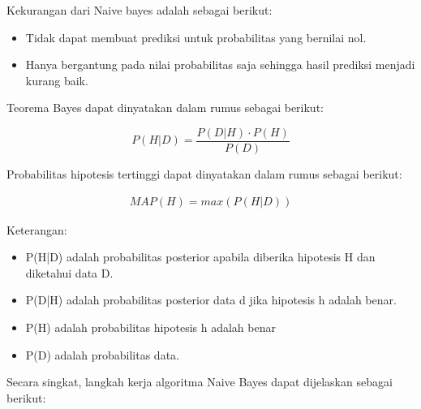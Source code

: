 \noindent Kekurangan dari Naive bayes adalah sebagai berikut:

\begin{itemize}
\item Tidak dapat membuat prediksi untuk probabilitas yang bernilai nol.
\item Hanya bergantung pada nilai probabilitas saja sehingga hasil prediksi menjadi kurang baik.
\end{itemize}
 
\noindent Teorema Bayes dapat dinyatakan dalam rumus sebagai berikut:

\begin{equation}
P(H|D) = \frac{P(D|H) \cdot P(H)}{P(D)}
\end{equation}

\noindent Probabilitas hipotesis tertinggi dapat dinyatakan dalam rumus sebagai berikut:

\begin{align}
MAP(H) = max(P(H|D))
\end{align}

\noindent Keterangan:
\begin{itemize}
\item P(H|D) adalah probabilitas posterior apabila diberika hipotesis H dan diketahui data D. 
\item P(D|H) adalah probabilitas posterior  data d jika hipotesis h adalah benar.
\item P(H) adalah probabilitas hipotesis h adalah benar 
\item P(D) adalah probabilitas data.
\end{itemize}

\noindent Secara singkat, langkah kerja algoritma Naive Bayes dapat dijelaskan sebagai berikut:

